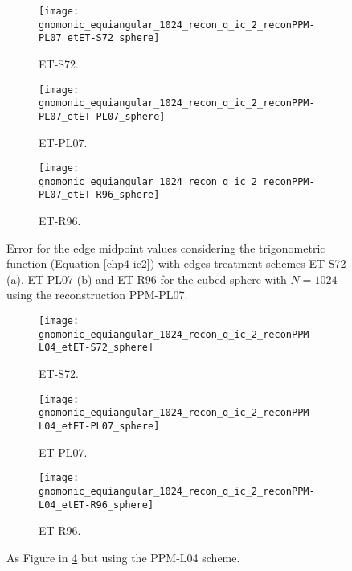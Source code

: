\begin{figure}[!htb]
	\centering
	\begin{subfigure}{0.49\textwidth}
		\centering
		\texttt{[image: gnomonic\_equiangular\_1024\_recon\_q\_ic\_2\_reconPPM-PL07\_etET-S72\_sphere]}
		\caption{ET-S72.\label{chp4-exp4-a}}
	\end{subfigure}
	\begin{subfigure}{0.49\textwidth}
		\centering
		\texttt{[image: gnomonic\_equiangular\_1024\_recon\_q\_ic\_2\_reconPPM-PL07\_etET-PL07\_sphere]}
		\caption{ET-PL07.\label{chp4-exp4-b}}
	\end{subfigure}
	\begin{subfigure}{0.49\textwidth}
	\centering
	\texttt{[image: gnomonic\_equiangular\_1024\_recon\_q\_ic\_2\_reconPPM-PL07\_etET-R96\_sphere]}
	\caption{ET-R96.\label{chp4-exp4-c}}
\end{subfigure}
	\caption{Error for the edge midpoint values considering the trigonometric function (Equation \eqref{chp4-ic2})
	with edges treatment schemes ET-S72 (a), ET-PL07 (b) and ET-R96 for the cubed-sphere with $N=1024$ using the reconstruction PPM-PL07.\label{chp4-exp4}}
\end{figure}

\begin{figure}[!htb]
	\centering
	\begin{subfigure}{0.49\textwidth}
		\centering
		\texttt{[image: gnomonic\_equiangular\_1024\_recon\_q\_ic\_2\_reconPPM-L04\_etET-S72\_sphere]}
		\caption{ET-S72.\label{chp4-exp5-a}}
	\end{subfigure}
	\begin{subfigure}{0.49\textwidth}
		\centering
		\texttt{[image: gnomonic\_equiangular\_1024\_recon\_q\_ic\_2\_reconPPM-L04\_etET-PL07\_sphere]}
		\caption{ET-PL07.\label{chp4-exp5-b}}
	\end{subfigure}
	\begin{subfigure}{0.49\textwidth}
		\centering
		\texttt{[image: gnomonic\_equiangular\_1024\_recon\_q\_ic\_2\_reconPPM-L04\_etET-R96\_sphere]}
		\caption{ET-R96.\label{chp4-exp5-c}}
	\end{subfigure}
	\caption{As Figure in \ref{chp4-exp4} but using the PPM-L04 scheme.\label{chp4-exp5}}
\end{figure}
